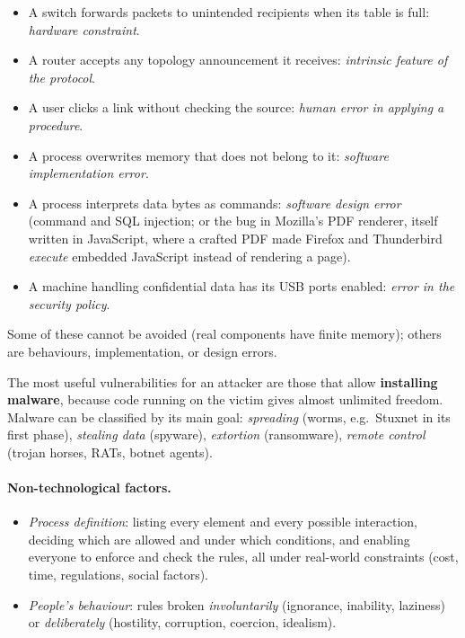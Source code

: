 \begin{example}
\leavevmode
\begin{itemize}
    \item A switch forwards packets to unintended recipients when its table is full: \emph{hardware constraint}.
    \item A router accepts any topology announcement it receives: \emph{intrinsic feature of the protocol}.
    \item A user clicks a link without checking the source: \emph{human error in applying a procedure}.
    \item A process overwrites memory that does not belong to it: \emph{software implementation error}.
    \item A process interprets data bytes as commands: \emph{software design error} (command and SQL injection; or the bug in Mozilla's PDF renderer, itself written in JavaScript, where a crafted PDF made Firefox and Thunderbird \emph{execute} embedded JavaScript instead of rendering a page).
    \item A machine handling confidential data has its USB ports enabled: \emph{error in the security policy}.
\end{itemize}
Some of these cannot be avoided (real components have finite memory); others are behaviours, implementation, or design errors.
\end{example}

The most useful vulnerabilities for an attacker are those that allow \textbf{installing malware}, because code running on the victim gives almost unlimited freedom. Malware can be classified by its main goal: \emph{spreading} (worms, e.g.\ Stuxnet in its first phase), \emph{stealing data} (spyware), \emph{extortion} (ransomware), \emph{remote control} (trojan horses, RATs, botnet agents).

\paragraph{Non-technological factors.}
\begin{itemize}
    \item \emph{Process definition}: listing every element and every possible interaction, deciding which are allowed and under which conditions, and enabling everyone to enforce and check the rules, all under real-world constraints (cost, time, regulations, social factors).
    \item \emph{People's behaviour}: rules broken \emph{involuntarily} (ignorance, inability, laziness) or \emph{deliberately} (hostility, corruption, coercion, idealism).
\end{itemize}

